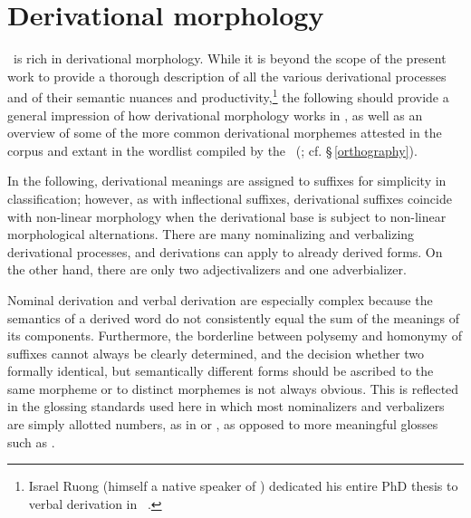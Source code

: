 


\chapter{Derivational morphology}\label{derivMorph}
\PS\ is rich in derivational morphology. While it is beyond the scope of the present work to provide a thorough description of all the various derivational processes and of their semantic nuances and productivity,\footnote{Israel Ruong (himself a native speaker of \PS) dedicated his entire PhD thesis to verbal derivation in \PS\ \citep{Ruong1943}.} %
the following should provide a general impression of how derivational morphology works in \PS, as well as an overview of some of the more common derivational morphemes attested in the corpus and extant in the wordlist compiled by the \WLP\ (\cite{insamlingPS2011}; cf. §\,\ref{orthography}). 

In the following, derivational meanings are assigned to suffixes for simplicity in classification; however, as with inflectional suffixes, derivational suffixes coincide with non-linear morphology when the derivational base is subject to non-linear morphological alternations. %
There are many nominalizing and verbalizing derivational processes, and derivations can apply to already derived forms. 
On the other hand, there are only two adjectivalizers and one adverbializer. 

Nominal derivation and verbal derivation are especially complex because the semantics of a derived word do not consistently equal the sum of the meanings of its components. Furthermore, the borderline between polysemy and homonymy of suffixes cannot always be clearly determined, and the decision whether two formally identical, but semantically different forms should be ascribed to the same morpheme or to distinct morphemes is not always obvious. 
This is reflected in the glossing standards used here in which most nominalizers and verbalizers are simply allotted numbers, as in  or , as opposed to more meaningful glosses such as . 

